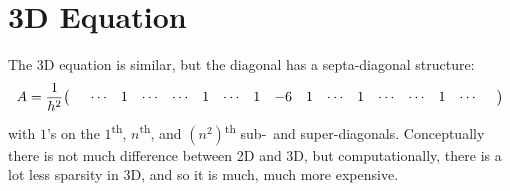 \documentclass{article}
\begin{document}
    \section{3D Equation}
        The 3D equation is similar, but the diagonal has a septa-diagonal structure:
        \begin{align}
            A = \frac{1}{h^2}\qty(\begin{array}{ccccccccccccccccc}
            & \cdots & 1 & \cdots & \cdots & 1 & \cdots & 1 & -6 & 1 & \cdots & 1 & \cdots & \cdots & 1 & \cdots &
            \end{array})
        \end{align}
        with $1$'s on the $1$\textsuperscript{th}, $n$\textsuperscript{th}, and $(n^2)$\textsuperscript{th} sub-~and super-diagonals.  Conceptually there is not much difference between 2D and 3D, but computationally, there is a lot less sparsity in 3D, and so it is much, much more expensive.
\end{document}
